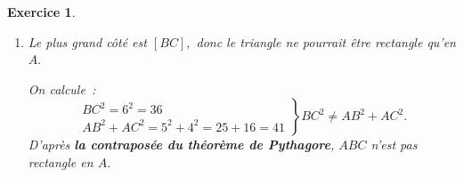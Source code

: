\documentclass[10pt]{article}
\newtheorem{exo}{Exercice}
\begin{document}
\begin{exo}
\begin{enumerate}
\begin{multicols}{2}
\danger Sauf si l'énoncé le demande, ne donnez pas de valeur approchée.

\end{multicols}
\item Le plus grand côté est $\left[BC\right],$ donc le triangle ne pourrait être rectangle qu'en $A.$

On calcule~:
\[
\left.
    \begin{array}{ll}
        BC^2=6^2=36\\
        AB^2+AC^2=5^2+4^2=25+16=41
    \end{array}
\right \}BC^2\not=AB^2+AC^2.
\]
D'après \textbf{la contraposée du théorème de Pythagore}, $ABC$ n'est pas rectangle en $A.$

\end{enumerate}

\end{exo}
\end{document}
